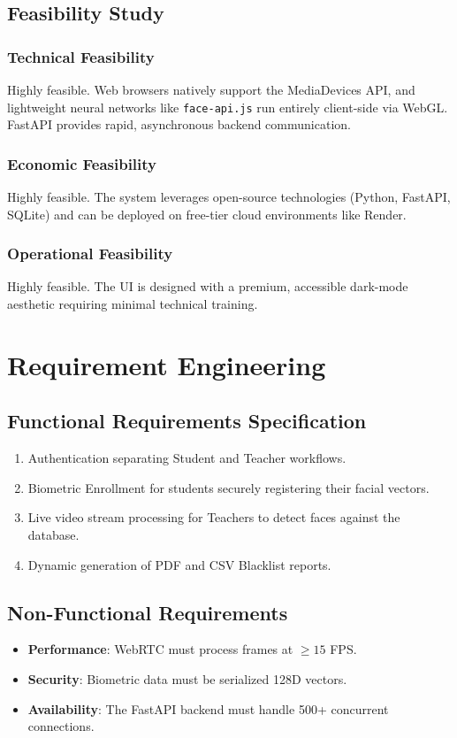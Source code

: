 \documentclass[12pt,a4paper]{report}
\begin{document}
\subsection{Feasibility Study}
\subsubsection{Technical Feasibility}
Highly feasible. Web browsers natively support the MediaDevices API, and lightweight neural networks like \texttt{face-api.js} run entirely client-side via WebGL. FastAPI provides rapid, asynchronous backend communication.

\subsubsection{Economic Feasibility}
Highly feasible. The system leverages open-source technologies (Python, FastAPI, SQLite) and can be deployed on free-tier cloud environments like Render.

\subsubsection{Operational Feasibility}
Highly feasible. The UI is designed with a premium, accessible dark-mode aesthetic requiring minimal technical training.

\section{Requirement Engineering}
\subsection{Functional Requirements Specification}
\begin{enumerate}
    \item Authentication separating Student and Teacher workflows.
    \item Biometric Enrollment for students securely registering their facial vectors.
    \item Live video stream processing for Teachers to detect faces against the database.
    \item Dynamic generation of PDF and CSV Blacklist reports.
\end{enumerate}

\subsection{Non-Functional Requirements}
\begin{itemize}
    \item \textbf{Performance}: WebRTC must process frames at $\ge 15$ FPS.
    \item \textbf{Security}: Biometric data must be serialized 128D vectors.
    \item \textbf{Availability}: The FastAPI backend must handle 500+ concurrent connections.
\end{itemize}
\end{document}
